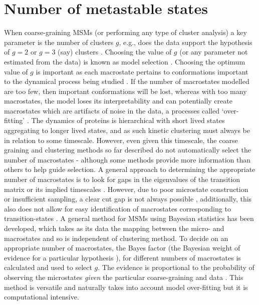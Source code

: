 \section{Number of metastable states}\label{sec:num_metastable}
When coarse-graining MSMs (or performing any type of cluster analysis) a key parameter is the number of clusters $g$, e.g., does the data support the hypothesis of $g=2$ or $g=3$ (say) clusters \cite{milliganExaminationProceduresDetermining1985}. Choosing the value of $g$ (or any parameter not estimated from the data) is known as model selection \cite[chapter 7]{friedman2001elements}. Choosing the optimum value of $g$ is important as each macrostate pertains to conformations important to the dynamical process being studied \cite{frauenfelderEnergyLandscapesMotions1991}. If the number of macrostates modelled are too few, then important conformations will be lost, whereas with too many macrostates, the model loses its interpretability and can potentially  create macrostates which are artifacts of noise in the data, a processes called `over-fitting' \cite[chapter 7]{friedman2001elements}. The dynamics of proteins is hierarchical \cite{frauenfelderEnergyLandscapesMotions1991} with short lived states aggregating to longer lived states, and as such kinetic clustering must always be in relation to some timescale. However, even given this timescale, the coarse graining and clustering methods so far described do not automatically select the number of macrostates - although some methods provide more information than others to help guide selection. A general approach to determining the appropriate number of macrostates is to look for gaps in the eigenvalues of the transition matrix or its implied timescales \cite{prinzMarkovModelsMolecular2011, mcgibbonVariationalCrossvalidationSlow2015, deuflhardIdentificationAlmostInvariant2000a}. However, due to poor microstate construction or insufficient sampling, a clear cut gap is not always possible \cite{bowmanQuantitativeComparisonAlternative2013}, additionally, this also does not allow for easy identification of macrostates corresponding to transition-states \cite{martiniVariationalIdentificationMarkovian2017}. A general method for MSMs using Bayesian statistics has been developed, which takes as its data the mapping between the micro- and macrostates \cite{bacalladoBayesianComparisonMarkov2009a} and so is independent of clustering method. To decide on an appropriate number of macrostates, the Bayes factor (the Bayesian weight of evidence for a particular hypothesis \cite{kassBayesFactors1995}), for different numbers of macrostates is calculated and used to select $g$. The evidence is proportional to the probability of observing the microstates \emph{given} the particular coarse-graining and data \cite{bacalladoBayesianComparisonMarkov2009a}. This method is versatile and naturally takes into account model over-fitting \cite{bacalladoBayesianComparisonMarkov2009a} but it is computational intensive.  

